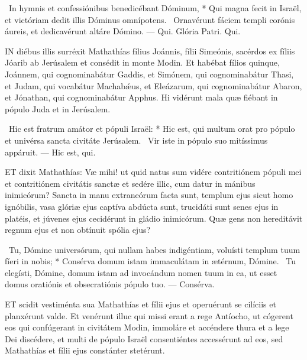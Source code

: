 \R\ In hymnis et confessiónibus benedicébant Dóminum, * Qui magna fecit in Israël, et victóriam dedit illis Dóminus omnípotens. \V\ Ornavérunt fáciem templi corónis áureis, et dedicavérunt altáre Dómino. — Qui. Glória Patri. Qui.




\lettrine[lines=2]{I}{N} diébus illis surréxit Mathathías fílius Joánnis, fílii Simeónis, sacérdos ex fíliis Jóarib ab Jerúsalem et consédit in monte Modin. Et habébat fílios quinque, Joánnem, qui cognominabátur Gaddis, et Simónem, qui cognominabátur Thasi, et Judam, qui vocabátur Machabǽus, et Eleázarum, qui cognominabátur Abaron, et Jónathan, qui cognominabátur Apphus. Hi vidérunt mala quæ fiébant in pópulo Juda et in Jerúsalem.

\R\ Hic est fratrum amátor et pópuli Israël: * Hic est, qui multum orat pro pópulo et univérsa sancta civitáte Jerúsalem. \V\ Vir iste in pópulo suo mitíssimus appáruit. — Hic est, qui.


\lettrine[lines=2]{E}{T} dixit Mathathías: Væ mihi! ut quid natus sum vidére contritiónem pópuli mei et contritiónem civitátis sanctæ et sedére illic, cum datur in mánibus inimicórum? Sancta in manu extraneórum facta sunt, templum ejus sicut homo ignóbilis, vasa glóriæ ejus captíva abdúcta sunt, trucidáti sunt senes ejus in platéis, et júvenes ejus cecidérunt in gládio inimicórum. Quæ gens non hereditávit regnum ejus et non obtínuit spólia ejus?

\R\ Tu, Dómine universórum, qui nullam habes indigéntiam, voluísti templum tuum fíeri in nobis; * Consérva domum istam immaculátam in ætérnum, Dómine. \V\ Tu elegísti, Dómine, domum istam ad invocándum nomen tuum in ea, ut esset domus oratiónis et obsecratiónis pópulo tuo. — Consérva.



\lettrine[lines=2]{E}{T} scidit vestiménta sua Mathathías et fílii ejus et operuérunt se cilíciis et planxérunt valde. Et venérunt illuc qui missi erant a rege Antíocho, ut cógerent eos qui confúgerant in civitátem Modin, immoláre et accéndere thura et a lege Dei discédere, et multi de pópulo Israël consentiéntes accessérunt ad eos, sed Mathathías et fílii ejus constánter stetérunt.

